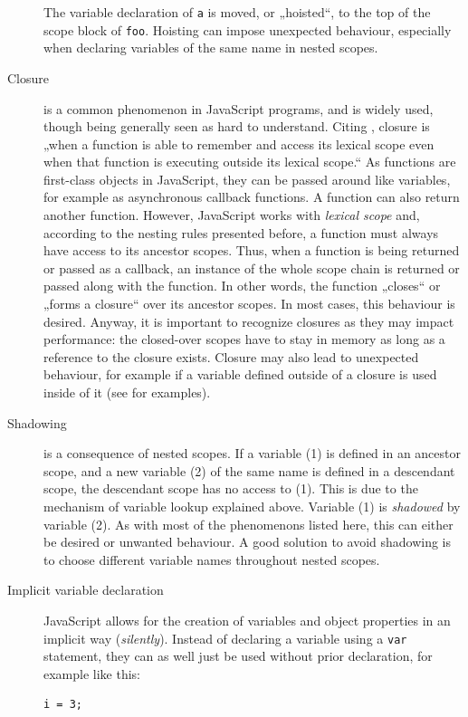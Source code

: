 \begin{description}
The variable declaration of \texttt{a} is moved, or „hoisted“, to the
top of the scope block of \texttt{foo}. Hoisting can impose unexpected
behaviour, especially when declaring variables of the same name in
nested scopes.
\item[Closure]
is a common phenomenon in JavaScript programs, and is widely used,
though being generally seen as hard to understand. Citing
, closure is „when a function is able to remember and
access its lexical scope even when that function is executing outside
its lexical scope.“ \citeyear{getify} As functions are first-class
objects in JavaScript, they can be passed around like variables, for
example as asynchronous callback functions. A function can also return
another function. However, JavaScript works with \emph{lexical scope}
and, according to the nesting rules presented before, a function must
always have access to its ancestor scopes. Thus, when a function is
being returned or passed as a callback, an instance of the whole scope
chain is returned or passed along with the function. In other words, the
function „closes“ or „forms a closure“ over its ancestor scopes. In most
cases, this behaviour is desired. Anyway, it is important to recognize
closures as they may impact performance: the closed-over scopes have to
stay in memory as long as a reference to the closure exists. Closure may
also lead to unexpected behaviour, for example if a variable defined
outside of a closure is used inside of it (see
 for examples).
\item[Shadowing]
is a consequence of nested scopes. If a variable (1) is defined in an
ancestor scope, and a new variable (2) of the same name is defined in a
descendant scope, the descendant scope has no access to (1). This is due
to the mechanism of variable lookup explained above. Variable (1) is
\emph{shadowed} by variable (2). As with most of the phenomenons listed
here, this can either be desired or unwanted behaviour. A good solution
to avoid shadowing is to choose different variable names throughout
nested scopes.
\item[Implicit variable declaration]
JavaScript allows for the creation of variables and object properties in
an implicit way (\emph{silently}). Instead of declaring a variable using
a \texttt{var} statement, they can as well just be used without prior
declaration, for example like this:

\begin{verbatim}
i = 3;
\end{verbatim}


\end{description}
